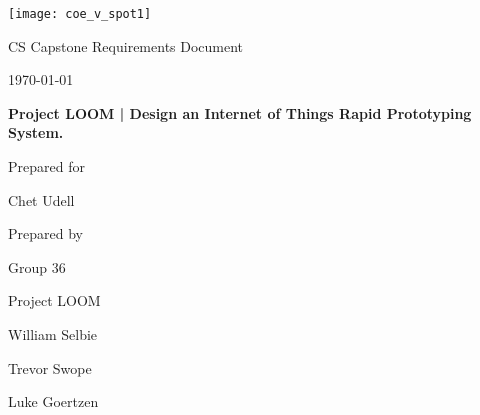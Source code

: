 \documentclass[onecolumn, draftclsnofoot,10pt, compsoc]{IEEEtran}
\def \CapstoneTeamName{		Project LOOM}
\def \CapstoneTeamNumber{		36}
\def \GroupMemberOne{			William Selbie}
\def \GroupMemberTwo{			Trevor Swope}
\def \GroupMemberThree{			Luke Goertzen}
\def \CapstoneProjectName{		Project LOOM | Design an Internet of Things Rapid Prototyping System.}
\def \CapstoneSponsorCompany{	}
\def \CapstoneSponsorPerson{		Chet Udell}
\def \DocType{	%
				Requirements Document
				}
\newcommand{\NameSigPair}[1]{\par
\makebox[2.75in][r]{#1} \hfil 	\makebox[3.25in]{\makebox[2.25in]{\hrulefill} \hfill		\makebox[.75in]{\hrulefill}}
\par\vspace{-12pt} \textit{\tiny\noindent
\makebox[2.75in]{} \hfil		\makebox[3.25in]{\makebox[2.25in][r]{Signature} \hfill	\makebox[.75in][r]{Date}}}}
\renewcommand{\NameSigPair}[1]{#1}
\begin{document}
\begin{titlepage}
    \begin{singlespace}
    	\texttt{[image: coe\_v\_spot1]}
        \hfill 
        \par\vspace{.2in}
        \centering
        \scshape{
            \huge CS Capstone \DocType \par
            {\large\today}\par
            \vspace{.5in}
            \textbf{\Huge\CapstoneProjectName}\par
            \vfill
            {\large Prepared for}\par
            \Huge \CapstoneSponsorCompany\par
            \vspace{5pt}
            {\Large\NameSigPair{\CapstoneSponsorPerson}\par}
            {\large Prepared by }\par
            Group\CapstoneTeamNumber\par
            \CapstoneTeamName\par 
            \vspace{5pt}
            {\Large
                \NameSigPair{\GroupMemberOne}\par
                \NameSigPair{\GroupMemberTwo}\par
                \NameSigPair{\GroupMemberThree}\par
            }
            \vspace{20pt}
        }
    \end{singlespace}
\end{titlepage}
\end{document}
